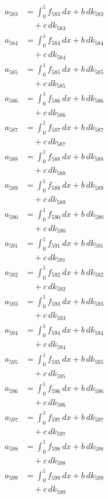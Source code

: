 \documentclass{article}
\begin{document}
\begin{align}
a_{583} &= \int_0^1 f_{583}\,dx + b\,dk_{583} \\
&\quad + c\,dk_{583} \\
a_{584} &= \int_0^1 f_{584}\,dx + b\,dk_{584} \\
&\quad + c\,dk_{584} \\
a_{585} &= \int_0^1 f_{585}\,dx + b\,dk_{585} \\
&\quad + c\,dk_{585} \\
a_{586} &= \int_0^1 f_{586}\,dx + b\,dk_{586} \\
&\quad + c\,dk_{586} \\
a_{587} &= \int_0^1 f_{587}\,dx + b\,dk_{587} \\
&\quad + c\,dk_{587} \\
a_{588} &= \int_0^1 f_{588}\,dx + b\,dk_{588} \\
&\quad + c\,dk_{588} \\
a_{589} &= \int_0^1 f_{589}\,dx + b\,dk_{589} \\
&\quad + c\,dk_{589} \\
a_{590} &= \int_0^1 f_{590}\,dx + b\,dk_{590} \\
&\quad + c\,dk_{590} \\
a_{591} &= \int_0^1 f_{591}\,dx + b\,dk_{591} \\
&\quad + c\,dk_{591} \\
a_{592} &= \int_0^1 f_{592}\,dx + b\,dk_{592} \\
&\quad + c\,dk_{592} \\
a_{593} &= \int_0^1 f_{593}\,dx + b\,dk_{593} \\
&\quad + c\,dk_{593} \\
a_{594} &= \int_0^1 f_{594}\,dx + b\,dk_{594} \\
&\quad + c\,dk_{594} \\
a_{595} &= \int_0^1 f_{595}\,dx + b\,dk_{595} \\
&\quad + c\,dk_{595} \\
a_{596} &= \int_0^1 f_{596}\,dx + b\,dk_{596} \\
&\quad + c\,dk_{596} \\
a_{597} &= \int_0^1 f_{597}\,dx + b\,dk_{597} \\
&\quad + c\,dk_{597} \\
a_{598} &= \int_0^1 f_{598}\,dx + b\,dk_{598} \\
&\quad + c\,dk_{598} \\
a_{599} &= \int_0^1 f_{599}\,dx + b\,dk_{599} \\
&\quad + c\,dk_{599} \\
\end{align}
\end{document}
